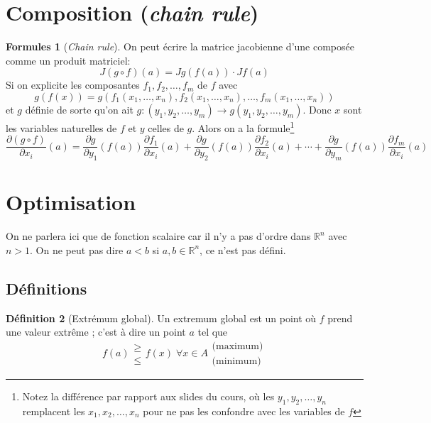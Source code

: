 \documentclass[11pt,a4paper]{article}
\theoremstyle{definition}
\newtheorem{mydef}{Définition}%
\newtheorem{myform}[mydef]{Formules}
\newcommand{\pa}{\partial}
\newcommand{\R}{\mathbb{R}}
\newcommand{\Rn}{\R^n}
\begin{document}
\section{Composition (\emph{chain rule})}

\begin{myform}[\emph{Chain rule}]
	On peut écrire la matrice jacobienne d'une composée comme un produit matriciel:
	\[ J(g \circ f)(a) = Jg(f(a)) \cdot Jf(a) \]
	Si on explicite les composantes $f_1, f_2, \dots , f_m$ de $f$ avec
	\[ g(f(x)) = g( f_1(x_1, \dots, x_n), f_2(x_1, \dots, x_n), \dots, f_m(x_1, \dots, x_n)) \]
	et $g$ définie de sorte qu'on ait $g : (y_1, y_2, \dots , y_m) \rightarrow g(y_1, y_2, \dots, y_m)$. Donc $x$ sont les variables naturelles de $f$ et $y$ celles de $g$.
	Alors on a la formule\footnote{Notez la différence par rapport aux slides du cours, où les $y_1, y_2, \dots, y_n$ remplacent les $x_1, x_2, \dots, x_n$ pour ne pas les confondre avec les variables de $f$}
	\[ \frac{\pa (g \circ f)}{\pa x_i}(a) = \frac{ \pa g}{\pa y_1}(f(a)) \frac{\pa f_1}{\pa x_i}(a) + \frac{ \pa g}{\pa y_2}(f(a)) \frac{\pa f_2}{\pa x_i}(a) + \cdots + \frac{ \pa g}{\pa y_m}(f(a)) \frac{\pa f_m}{\pa x_i}(a) \]
\end{myform}


\section{Optimisation}

On ne parlera ici que de fonction scalaire car il n'y a pas d'ordre dans $\Rn$ avec $n > 1$.
On ne peut pas dire $a < b$ si $a, b \in \Rn$, ce n'est pas défini.

\subsection{Définitions}

\begin{mydef}[Extrémum global] Un extremum global est un point où $f$ prend une valeur extrême ; c'est à dire un point $a$ tel que
	\[ f(a) \begin{array}{l} \geq \\ \leq \end{array} f(x) \; \forall x \in A \begin{array}{l} \text{(maximum)} \\ \text{(minimum)}
	\end{array} \]
\end{mydef}
\end{document}
